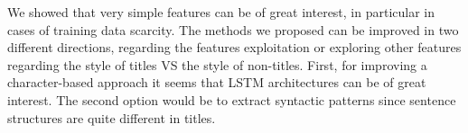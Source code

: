 We showed that very simple features can be of great interest, in particular in cases of training data scarcity.
 The methods we proposed can be improved in two different directions, regarding the features exploitation or exploring other features regarding the style of titles VS the style of non-titles. First, for improving a character-based approach it seems that LSTM architectures can be of great interest. The second option would be to extract syntactic patterns since sentence structures are quite different in titles.
